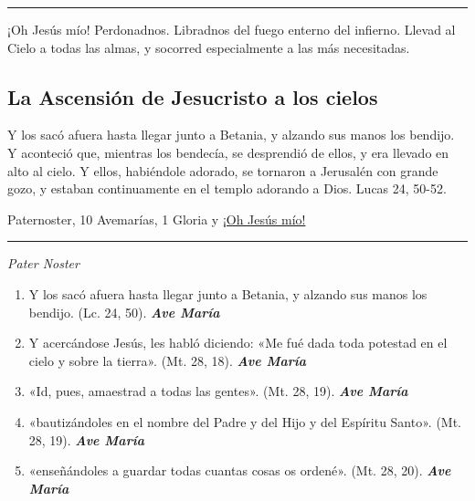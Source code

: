 \documentclass[a4paper,11pt, oneside]{report}
\begin{document}
{{      \begin{center}\rule{1\linewidth}{\linethickness}\end{center}      

      \medskip
      \hypertarget{finalResureccion}{¡Oh Jesús mío! Perdonadnos. Libradnos del fuego enterno del infierno. Llevad al Cielo a todas las almas, y socorred especialmente a las más 
      necesitadas.}
    }

  \subsection*{La Ascensión de Jesucristo a los cielos}
    {
      Y los sacó afuera hasta llegar junto a Betania, y alzando sus manos los bendijo. Y aconteció que, mientras los bendecía, se desprendió de ellos,
      y era llevado en alto al cielo. Y ellos, habiéndole adorado, se tornaron a Jerusalén con grande gozo, y estaban continuamente en el templo
      adorando a Dios. Lucas 24, 50-52.

       Paternoster, 10 Avemarías, 1 Gloria y \hyperlink{finalAscension}{¡Oh Jesús mío!}

      \begin{center}\rule{1\linewidth}{\linethickness}\end{center}

      \medskip
      \textit{Pater Noster}

      \begin{enumerate} 

        \item Y los sacó afuera hasta llegar junto a Betania, y alzando sus manos los bendijo. (Lc. 24, 50). \textbf{\textit{Ave María}}

        \item Y acercándose Jesús, les habló diciendo: «Me fué dada toda potestad en el cielo y sobre la tierra». (Mt. 28, 18). \textbf{\textit{Ave María}}

        \item «Id, pues, amaestrad a todas las gentes». (Mt. 28, 19). \textbf{\textit{Ave María}}

        \item «bautizándoles en el nombre del Padre y del Hijo y del Espíritu Santo». (Mt. 28, 19). \textbf{\textit{Ave María}}

        \item «enseñándoles a guardar todas cuantas cosas os ordené». (Mt. 28, 20). \textbf{\textit{Ave María}}


\end{enumerate}}}
\end{document}
